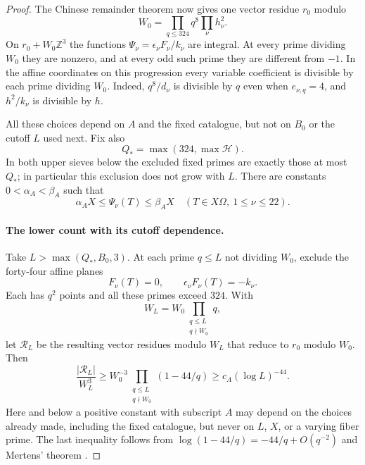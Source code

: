 \documentclass[11pt]{article}
\theoremstyle{definition}
\theoremstyle{remark}
\begin{document}
\begin{proof}
The Chinese remainder theorem now gives one vector residue $r_0$
modulo
\[
 W_0=\prod_{q\le324}q^8\prod_\nu h_\nu^2.
\]
On $r_0+W_0\mathbb Z^3$ the functions
$\Psi_\nu=\epsilon_\nu F_\nu/k_\nu$ are integral. At every prime
dividing $W_0$ they are nonzero, and at every odd such prime they
are different from $-1$. In the affine coordinates on this
progression every variable coefficient is divisible by each prime
dividing $W_0$. Indeed, $q^8/d_\nu$ is divisible by $q$ even when
$e_{\nu,q}=4$, and $h^2/k_\nu$ is divisible by $h$.

All these choices depend on $A$ and the fixed catalogue, but not on
$B_0$ or the cutoff $L$ used next. Fix also
\[
 Q_*=\max(324,\max\mathcal H).
\]
In both upper sieves below the excluded fixed primes are exactly
those at most $Q_*$; in particular this exclusion does not grow
with $L$. There are constants $0<\alpha_A<\beta_A$ such that
\[
 \alpha_A X\le\Psi_\nu(T)\le\beta_A X
 \quad(T\in X\Omega,\ 1\le\nu\le22).
\]

\paragraph{The lower count with its cutoff dependence.}
Take $L>\max(Q_*,B_0,3)$. At each prime $q\le L$ not dividing
$W_0$, exclude the forty-four affine planes
\[
 F_\nu(T)=0,\qquad \epsilon_\nu F_\nu(T)=-k_\nu.
\]
Each has $q^2$ points and all these primes exceed $324$. With
\[
 W_L=W_0\prod_{\substack{q\le L\\q\nmid W_0}}q,
\]
let $\mathcal R_L$ be the resulting vector residues modulo $W_L$
that reduce to $r_0$ modulo $W_0$. Then
\begin{equation}\label{eq:prime-density44}
 \frac{|\mathcal R_L|}{W_L^3}
 \ge W_0^{-3}\prod_{\substack{q\le L\\q\nmid W_0}}
       (1-44/q)
 \ge c_A(\log L)^{-44}.
\end{equation}
Here and below a positive constant with subscript $A$ may depend
on the choices already made, including the fixed catalogue, but
never on $L$, $X$, or a varying fiber prime. The last inequality
follows from $\log(1-44/q)=-44/q+O(q^{-2})$ and Mertens' theorem \cite[Theorem 1, with modulus $2$]{williams-mertens}.


\end{proof}
\end{document}
